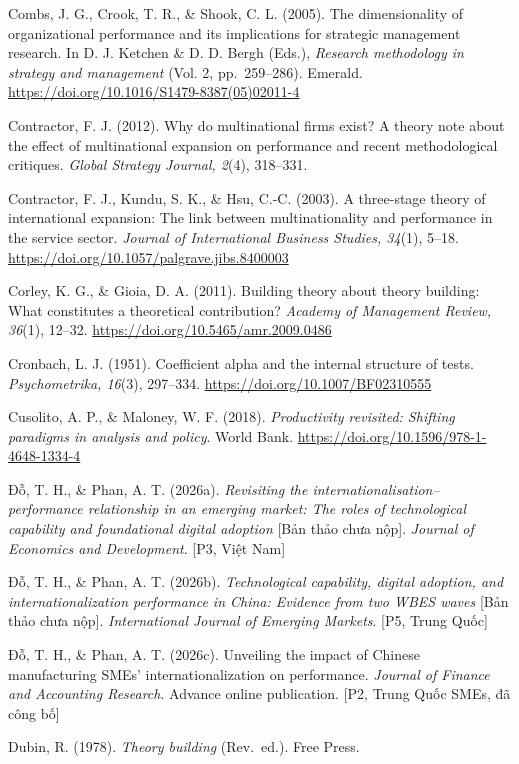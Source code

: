 \documentclass[
  a4paper,
  13pt]{extreport}
\begin{document}
Combs, J. G., Crook, T. R., \& Shook, C. L. (2005). The dimensionality
of organizational performance and its implications for strategic
management research. In D. J. Ketchen \& D. D. Bergh (Eds.),
\emph{Research methodology in strategy and management} (Vol. 2,
pp.~259--286). Emerald.
\url{https://doi.org/10.1016/S1479-8387(05)02011-4}

Contractor, F. J. (2012). Why do multinational firms exist? A theory
note about the effect of multinational expansion on performance and
recent methodological critiques. \emph{Global Strategy Journal, 2}(4),
318--331.

Contractor, F. J., Kundu, S. K., \& Hsu, C.-C. (2003). A three-stage
theory of international expansion: The link between multinationality and
performance in the service sector. \emph{Journal of International
Business Studies, 34}(1), 5--18.
\url{https://doi.org/10.1057/palgrave.jibs.8400003}

Corley, K. G., \& Gioia, D. A. (2011). Building theory about theory
building: What constitutes a theoretical contribution? \emph{Academy of
Management Review, 36}(1), 12--32.
\url{https://doi.org/10.5465/amr.2009.0486}

Cronbach, L. J. (1951). Coefficient alpha and the internal structure of
tests. \emph{Psychometrika, 16}(3), 297--334.
\url{https://doi.org/10.1007/BF02310555}

Cusolito, A. P., \& Maloney, W. F. (2018). \emph{Productivity revisited:
Shifting paradigms in analysis and policy}. World Bank.
\url{https://doi.org/10.1596/978-1-4648-1334-4}

Đỗ, T. H., \& Phan, A. T. (2026a). \emph{Revisiting the
internationalisation--performance relationship in an emerging market:
The roles of technological capability and foundational digital adoption}
{[}Bản thảo chưa nộp{]}. \emph{Journal of Economics and Development}.
{[}P3, Việt Nam{]}

Đỗ, T. H., \& Phan, A. T. (2026b). \emph{Technological capability,
digital adoption, and internationalization performance in China:
Evidence from two WBES waves} {[}Bản thảo chưa nộp{]}.
\emph{International Journal of Emerging Markets}. {[}P5, Trung Quốc{]}

Đỗ, T. H., \& Phan, A. T. (2026c). Unveiling the impact of Chinese
manufacturing SMEs' internationalization on performance. \emph{Journal
of Finance and Accounting Research}. Advance online publication. {[}P2,
Trung Quốc SMEs, đã công bố{]}

Dubin, R. (1978). \emph{Theory building} (Rev.~ed.). Free Press.
\end{document}
